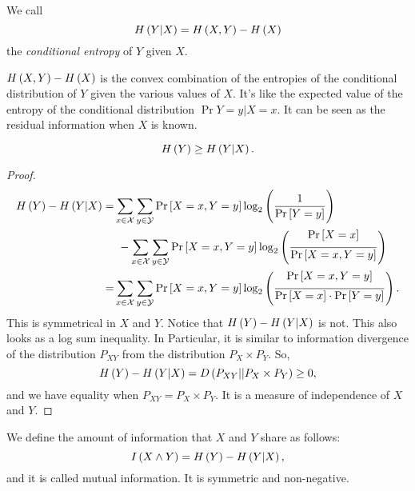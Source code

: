 \begin{definition}
	We call
	\begin{equation*}
		H\left({Y | X}\right) = H\left({X,Y}\right) - H\left({X}\right)
	\end{equation*}
	the \emph{conditional entropy} of $Y$ given $X$.
\end{definition}

$H\left({X,Y}\right) - H\left({X}\right)$ is the convex combination of the entropies of the conditional distribution of $Y$ given the various values of $X$.
It's like the expected value of the entropy of the conditional distribution $\Pr{Y = y | X = x}$.
It can be seen as the residual information when $X$ is known.

\begin{prop}
	\begin{equation*}
		H\left({Y}\right) \ge H\left({Y | X}\right). 
	\end{equation*}
\end{prop}

\begin{proof}
	\begin{align*}
		H\left({Y}\right) - H\left({Y | X}\right)
		= &
		\sum_{x \in \mathcal{X}} \sum_{y \in \mathcal{Y}} \mathop{\mathrm{Pr}}\limits_{} \left[ {X = x, Y = y} \right]
		\log_2 \left( \frac{1}{\mathop{\mathrm{Pr}}\limits_{} \left[ {Y=y} \right]} \right)
		\\ 
		&~- \sum_{x \in \mathcal{X}} \sum_{y \in \mathcal{Y}} \mathop{\mathrm{Pr}}\limits_{} \left[ {X = x, Y = y} \right]
		\log_2 \left( \frac{\mathop{\mathrm{Pr}}\limits_{} \left[ {X = x} \right]}{\mathop{\mathrm{Pr}}\limits_{} \left[ {X = x, Y = y} \right]} \right)
		\\
		= &
		\sum_{x \in \mathcal{X}} \sum_{y \in \mathcal{Y}} \mathop{\mathrm{Pr}}\limits_{} \left[ {X = x, Y = y} \right]
		\log_2 \left( \frac{\mathop{\mathrm{Pr}}\limits_{} \left[ {X = x, Y = y} \right]}{\mathop{\mathrm{Pr}}\limits_{} \left[ {X = x} \right] \cdot \mathop{\mathrm{Pr}}\limits_{} \left[ {Y = y} \right]} \right).
	\end{align*}
	This is symmetrical in $X$ and $Y$.
	Notice that $H\left({Y}\right) - H\left({Y | X}\right)$ is not.
	This also looks as a log sum inequality.
	In Particular, it is similar to information divergence of the distribution $P_{XY}$ from the distribution $P_X \times P_Y$. So,
	\begin{equation*}
		H\left({Y}\right) - H\left({Y | X}\right)
		=
		D \left( P_{XY} || P_X \times P_Y \right)
		\ge 0,
	\end{equation*}
	and we have equality when $P_{XY} = P_X \times P_Y$.
	It is a measure of independence of $X$ and $Y$.
\end{proof}

\begin{definition}
	We define the amount of information that $X$ and $Y$ share as follows:
	\begin{equation*}
		I \left( {X \land Y} \right) = H\left({Y}\right) - H\left({Y | X}\right), 
	\end{equation*}
	and it is called mutual information.
	It is symmetric and non-negative. 
\end{definition}

